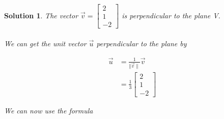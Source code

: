 \documentclass{article}
\newtheorem*{solution}{Solution}
\begin{document}
\begin{solution}
The vector $\vec{v} = \begin{bmatrix} 2 \\ 1 \\ -2 \end{bmatrix}$ is perpendicular to the plane V. 
\\
\\
We can get the unit vector $\vec{u}$ perpendicular to the plane by

\begin{align*}
\displaystyle \vec{u} &= \frac{1}{\Vert \vec{v} \rVert} \vec{v} \\
&= \displaystyle \frac{1}{3} \begin{bmatrix} 2 \\ 1 \\ -2 \end{bmatrix} 
\end{align*}

We can now use the formula


\end{solution}
\end{document}
